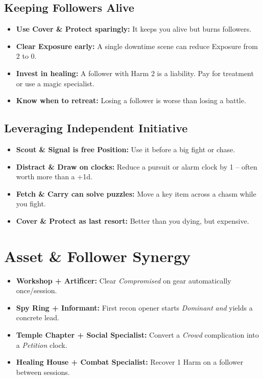 \subsection*{Keeping Followers Alive}
\begin{itemize}
  \item \textbf{Use Cover \& Protect sparingly:} It keeps you alive but burns followers.
  \item \textbf{Clear Exposure early:} A single downtime scene can reduce Exposure from 2 to 0.
  \item \textbf{Invest in healing:} A follower with Harm 2 is a liability. Pay for treatment or use a magic specialist.
  \item \textbf{Know when to retreat:} Losing a follower is worse than losing a battle.
\end{itemize}

\subsection*{Leveraging Independent Initiative}
\begin{itemize}
  \item \textbf{Scout \& Signal is free Position:} Use it before a big fight or chase.
  \item \textbf{Distract \& Draw on clocks:} Reduce a pursuit or alarm clock by 1 – often worth more than a +1d.
  \item \textbf{Fetch \& Carry can solve puzzles:} Move a key item across a chasm while you fight.
  \item \textbf{Cover \& Protect as last resort:} Better than you dying, but expensive.
\end{itemize}

\section{Asset \& Follower Synergy}
\begin{itemize}
  \item \textbf{Workshop + Artificer:} Clear \emph{Compromised} on gear automatically once/session.
  \item \textbf{Spy Ring + Informant:} First recon opener starts \emph{Dominant} \emph{and} yields a concrete lead.
  \item \textbf{Temple Chapter + Social Specialist:} Convert a \emph{Crowd} complication into a \emph{Petition} clock.
  \item \textbf{Healing House + Combat Specialist:} Recover 1 Harm on a follower between sessions.
\end{itemize}

